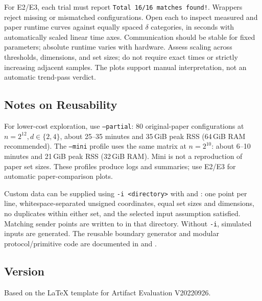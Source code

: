 For E2/E3, each trial must report \texttt{Total 16/16 matches found!}.
Wrappers reject missing or mismatched configurations. Open each
 to inspect measured and paper runtime curves
against equally spaced $\delta$ categories, in seconds with automatically
scaled linear time axes.
Communication should be stable for fixed parameters; absolute runtime varies
with hardware. Assess scaling across thresholds, dimensions, and set sizes;
do not require exact times or strictly increasing adjacent samples.
The plots support manual interpretation, not an automatic trend-pass verdict.

\subsection{Notes on Reusability}
For lower-cost exploration, use
 \texttt{--partial}: 80 original-paper
configurations at $n=2^{12},d\in\{2,4\}$, about 25--35 minutes and 35\,GiB
peak RSS (64\,GiB RAM recommended). The \texttt{--mini} profile uses the same
matrix at $n=2^{10}$: about 6--10 minutes and 21\,GiB peak RSS (32\,GiB RAM).
Mini is not a reproduction of paper set sizes. These profiles produce logs
and summaries; use E2/E3 for automatic paper-comparison plots.

Custom data can be supplied using \texttt{-i <directory>} with
 and : one point per line,
whitespace-separated unsigned coordinates, equal set sizes and dimensions,
no duplicates within either set, and the selected input assumption satisfied.
Matching sender points are written to  in that directory.
Without \texttt{-i}, simulated inputs are generated. The reusable boundary
generator and modular protocol/primitive code are documented in
 and .

\subsection{Version}
Based on the LaTeX template for Artifact Evaluation V20220926.
